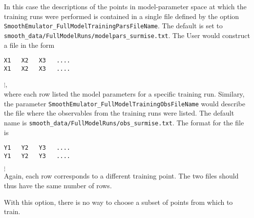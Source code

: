 \documentclass[UserManual.tex]{subfiles}
\begin{document}
In this case the descriptions of the points in model-parameter space at which the training runs were performed is contained in a single file defined by the option {\tt SmoothEmulator\_FullModelTrainingParsFileName}. The default is set to {\tt smooth\_data/FullModelRuns/modelpars_surmise.txt}. The User would construct a file in the form
\vspace*{-8pt}
{\tt\begin{verbatim}
X1   X2   X3   ....
X1   X2   X3   ....
\end{verbatim}}
\vspace*{-16pt}
 \hspace*{18pt}$\vdots$,\\
where each row listed the model parameters for a specific training run. Similary, the parameter {\tt SmoothEmulator\_FullModelTrainingObsFileName} would describe the file where the observables from the training runs were listed. The default name is {\tt smooth_data/FullModelRuns/obs_surmise.txt}. The format for the file is 
\vspace*{-8pt}
{\tt\begin{verbatim}
Y1   Y2   Y3   ....
Y1   Y2   Y3   ....
\end{verbatim}}
\vspace*{-16pt}
 \hspace*{28pt}$\vdots$\\
Again, each row corresponds to a different training point. The two files should thus have the same number of rows.

With this option, there is no way to choose a subset of points from which to train. 
\end{document}
